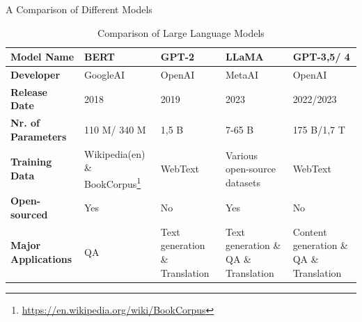 \documentclass[t]{beamer}
\begin{document}
\begin{frame}{A Comparison of Different Models}
  \begin{table}[H]
    \centering
    \small
    \begin{tabular}{| p{4cm} | p{2cm} | p{2cm} | p{2cm} | p{2cm} |}
    \hline
    \textbf{Model Name} & BERT & GPT-2 & LLaMA & GPT-3,5/ 4 \\
    \hline
    \textbf{Developer} & GoogleAI & OpenAI & MetaAI & OpenAI \\
    \hline
    \textbf{Release Date} & 2018 & 2019 & 2023 & 2022/2023 \\
    \hline
    \textbf{Nr. of Parameters} & 110 M/ 340 M & 1,5 B & 7-65 B & 175 B/1,7 T \\
    \hline
    \textbf{Training Data} & Wikipedia(en) \& BookCorpus\footnote{\url{https://en.wikipedia.org/wiki/BookCorpus}} & WebText & Various open-source datasets & WebText \\
    \hline
    \textbf{Open-sourced} & Yes & No & Yes & No \\
    \hline
    \textbf{Major Applications} & QA & Text generation \& Translation & Text generation \& QA \& Translation & Content generation \& QA \& Translation \\
    \hline
    \end{tabular}
    \caption{Comparison of Large Language Models}
    \label{table:comparison}
  \end{table}
\end{frame}
\end{document}
